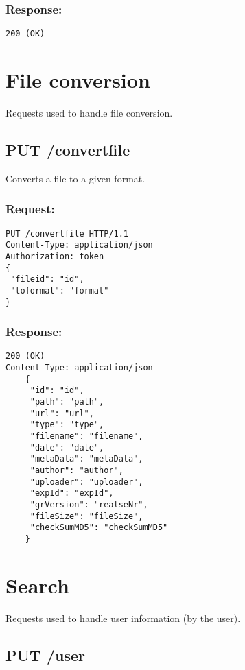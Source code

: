 \subsubsection*{Response:}
\begin{verbatim}
200 (OK)
\end{verbatim}

\section*{File conversion}

Requests used to handle file conversion.

\subsection*{PUT /convertfile}

Converts a file to a given format.

\subsubsection*{Request:}
\begin{verbatim}
PUT /convertfile HTTP/1.1
Content-Type: application/json
Authorization: token
{ 
 "fileid": "id", 
 "toformat": "format"
}
\end{verbatim}

\subsubsection*{Response:} 
\begin{verbatim}
200 (OK)
Content-Type: application/json
    {
     "id": "id",
     "path": "path",
     "url": "url",
     "type": "type",
     "filename": "filename",
     "date": "date",
     "metaData": "metaData",
     "author": "author",
     "uploader": "uploader",
     "expId": "expId",
     "grVersion": "realseNr",
     "fileSize": "fileSize",
     "checkSumMD5": "checkSumMD5"
    }
\end{verbatim}

\section*{Search}

Requests used to handle user information (by the user).

\subsection*{PUT /user}


